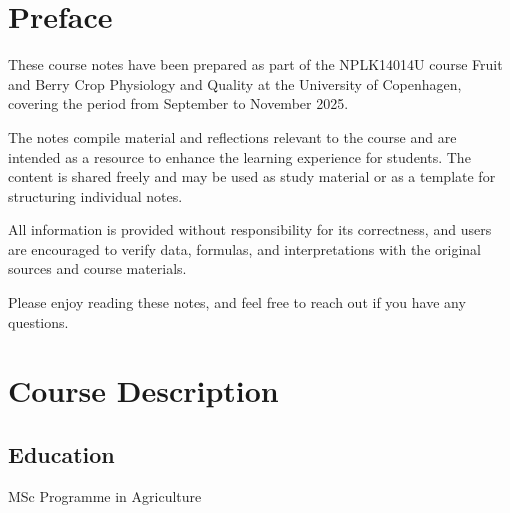 \chapter*{Preface}
\setlength{\headheight}{12.71342pt}
\addtolength{\topmargin}{-0.71342pt}
These course notes have been prepared as part of the NPLK14014U course Fruit and Berry Crop Physiology and Quality at the University of Copenhagen, covering the period from September to November 2025.

\vspace{1em}
The notes compile material and reflections relevant to the course and are intended as a resource to enhance the learning experience for students. The content is shared freely and may be used as study material or as a template for structuring individual notes.

\vspace{1em}
All information is provided without responsibility for its correctness, and users are encouraged to verify data, formulas, and interpretations with the original sources and course materials.

\vspace{1em}
Please enjoy reading these notes, and feel free to reach out if you have any questions.


\chapter*{Course Description}
\setlength{\headheight}{12.71342pt}
\addtolength{\topmargin}{-0.71342pt}

\section*{Education}
MSc Programme in Agriculture


